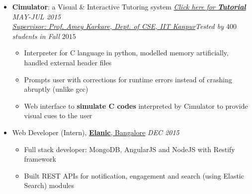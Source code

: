 \documentclass[letterpaper,11pt]{article}
\begin{document}
{\begin{itemize}
    \item \textbf{Cimulator}: a Visual \& Interactive Tutoring system\hspace{0.2in} \href{http://home.iitk.ac.in/~kunalkap/Cimulator.html}{\textit{Click here for \textbf{Tutorial}}} \hfill \textit{MAY-JUL 2015} \\
        \href{http://www.cse.iitk.ac.in/users/karkare/}{\textit{Supervisor: Prof. Amey Karkare, Dept. of CSE, IIT Kanpur}}\hfill \textit{Tested by $400$ students in Fall} $2015$\\
        \vspace{-1pt}
        \begin{itemize}
            \item Interpreter for C language in python, modelled memory artificially, handled external header files
                \vspace{-1pt}
            \item Prompts user with corrections for runtime errors instead of crashing abruptly (unlike gcc)
                \vspace{-1pt}
            \item Web interface to \textbf{simulate C codes} interpreted by Cimulator to provide visual cues to the user
                \vspace{-6pt}
        \end{itemize}
    \item Web Developer (Intern), \href{http://elanic.in//}{\textbf{Elanic}, Bangalore} \hfill \textit{DEC 2015}
        \vspace{-6pt}
        \begin{itemize}
            \item Full stack developer: MongoDB, AngularJS and NodeJS with Restify framework
                \vspace{-2pt}
            \item Built REST APIs for notification, engagement and search (using Elastic Search) modules
        \end{itemize}
        \vspace{-5pt}
\end{itemize}

}
\end{document}

